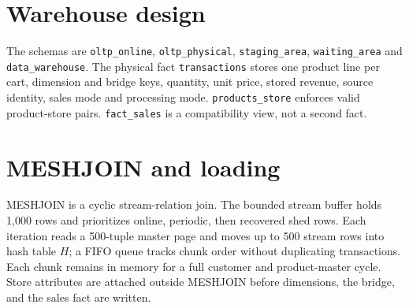 \documentclass[10pt,a4paper]{article}
\begin{document}
\section{Warehouse design}
The schemas are \texttt{oltp\_online}, \texttt{oltp\_physical}, \texttt{staging\_area}, \texttt{waiting\_area} and \texttt{data\_warehouse}. The physical fact \texttt{transactions} stores one product line per cart, dimension and bridge keys, quantity, unit price, stored revenue, source identity, sales mode and processing mode. \texttt{products\_store} enforces valid product-store pairs. \texttt{fact\_sales} is a compatibility view, not a second fact.

\begin{center}
\end{center}

\newpage

\section{MESHJOIN and loading}
MESHJOIN is a cyclic stream-relation join. The bounded stream buffer holds 1,000 rows and prioritizes online, periodic, then recovered shed rows. Each iteration reads a 500-tuple master page and moves up to 500 stream rows into hash table $H$; a FIFO queue tracks chunk order without duplicating transactions. Each chunk remains in memory for a full customer and product-master cycle. Store attributes are attached outside MESHJOIN before dimensions, the bridge, and the sales fact are written.
\end{document}
